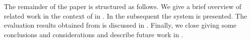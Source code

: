 The remainder of the paper is structured as follows.
We give a brief overview of related work in the context of 
  in .
In the subsequent  the
     system is presented.
The evaluation results obtained from  is discussed in
  .
Finally, we close giving some conclusions and considerations
  and describe future work in .
